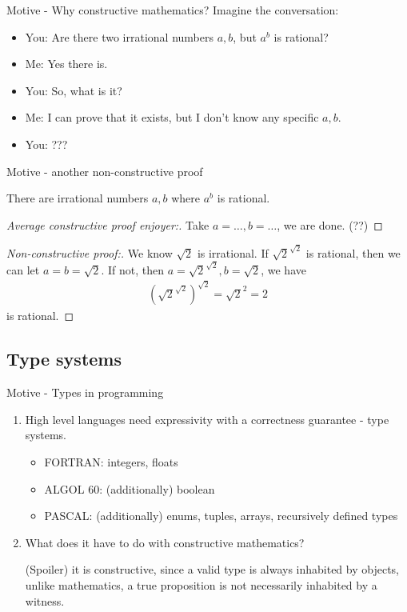\documentclass{beamer}
\theoremstyle{plain}
\begin{document}
\begin{frame}{Motive - Why constructive mathematics?}
  Imagine the conversation:
  \begin{itemize}
    \pause
    \item You: Are there two irrational numbers $a, b$, but $a^{b}$ is rational?
    \pause
    \item Me: Yes there is.
    \pause
    \item You: So, what is it?
    \pause
    \item Me: I can prove that it exists, but I don't know any specific $a, b$.
    \pause
    \item You: ???
  \end{itemize}
\end{frame}

\begin{frame}{Motive - another non-constructive proof}
  \begin{theorem}
    There are irrational numbers $a,b$ where $a^{b}$ is rational.
  \end{theorem}
  \pause
  \begin{proof}[Average constructive proof enjoyer:]
    Take $a = \ldots, b = \ldots$, we are done. (??)
  \end{proof}
  \pause
  \begin{proof}[Non-constructive proof:]
    We know $\sqrt{2}$ is irrational. If $\sqrt{2}^{\sqrt{2}}$ is rational, then
    we can let $a=b=\sqrt{2}$. If not, then $a=\sqrt{2}^{\sqrt{2}}, b=\sqrt{2}$,
    we have
    \begin{align*}
      (\sqrt{2}^{\sqrt{2}})^{\sqrt{2}} = \sqrt{2}^{2} = 2
    \end{align*}
    is rational.
  \end{proof}
\end{frame}

\subsection{Type systems}
\begin{frame}{Motive - Types in programming}
\begin{enumerate}
\item High level languages need expressivity with a correctness guarantee - type systems.
        \begin{itemize}
          \item FORTRAN: integers, floats
          \item ALGOL 60: (additionally) boolean
          \item PASCAL: (additionally) enums, tuples, arrays, recursively
                defined types
        \end{itemize}
\pause
\item What does it have to do with constructive mathematics?

(Spoiler) it is constructive, since a valid type is always inhabited by objects,
unlike mathematics, a true proposition is not necessarily inhabited by a witness.
\end{enumerate}
\end{frame}
\end{document}
